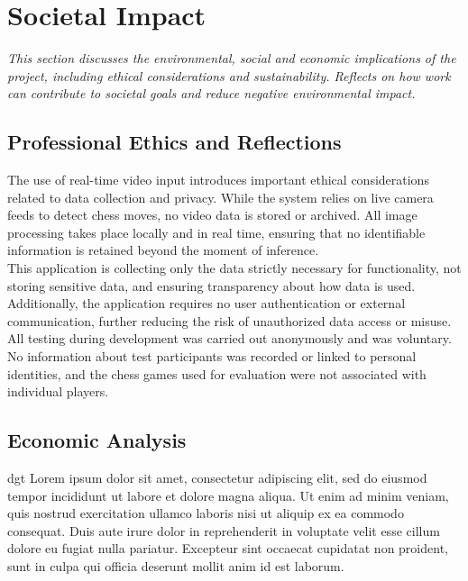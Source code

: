 \chapter{Societal Impact}

\begin{center}
    \textit{This section discusses the environmental, social and economic implications of the project, including ethical considerations and sustainability. Reflects on how work can contribute to societal goals and reduce negative environmental impact.}
\end{center}

\section{Professional Ethics and Reflections}
The use of real-time video input introduces important ethical considerations related to data collection and privacy. While the system relies on live camera feeds to detect chess moves, no video data is stored or archived. All image processing takes place locally and in real time, ensuring that no identifiable information is retained beyond the moment of inference. \\

This application is collecting only the data strictly necessary for functionality, not storing sensitive data, and ensuring transparency about how data is used. Additionally, the application requires no user authentication or external communication, further reducing the risk of unauthorized data access or misuse. \\

All testing during development was carried out anonymously and was voluntary. No information about test participants was recorded or linked to personal identities, and the chess games used for evaluation were not associated with individual players. \\

\section{Economic Analysis}
\gls{dgt} Lorem ipsum dolor sit amet, consectetur adipiscing elit, sed do eiusmod tempor incididunt ut labore et dolore magna aliqua. Ut enim ad minim veniam, quis nostrud exercitation ullamco laboris nisi ut aliquip ex ea commodo consequat. Duis aute irure dolor in reprehenderit in voluptate velit esse cillum dolore eu fugiat nulla pariatur. Excepteur sint occaecat cupidatat non proident, sunt in culpa qui officia deserunt mollit anim id est laborum. 

